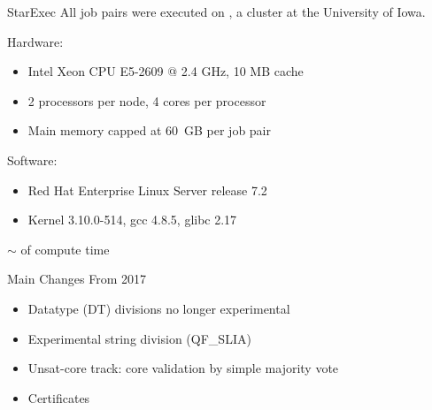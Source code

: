\documentclass{beamer}
\begin{document}

\begin{frame}{StarExec}
  All job pairs were executed on , a cluster at
  the University of Iowa.

  \bigskip

  \qquad\begin{minipage}{\dimexpr\textwidth-3cm}
              {\footnotesize
  Hardware:
  \begin{itemize}
  \item Intel Xeon CPU E5-2609 @ 2.4 GHz, 10 MB cache
  \item 2 processors per node, 4 cores per processor
  \item Main memory capped at 60~GB per job pair
  \end{itemize}

  \medskip

  Software:
  \begin{itemize}
  \item Red Hat Enterprise Linux Server release 7.2
  \item Kernel 3.10.0-514, gcc 4.8.5, glibc 2.17
  \end{itemize}
              }
  \end{minipage}

  \bigskip
  \bigskip

  $\sim$  of compute time
\end{frame}


\begin{frame}{Main Changes From 2017}
  \begin{itemize}
  \item Datatype (DT) divisions no longer experimental
    \bigskip
  \item Experimental string division (QF\_SLIA)
    \bigskip
  \item Unsat-core track: core validation by simple majority vote
    \bigskip
  \item Certificates
  \end{itemize}
\end{frame}

\end{document}
